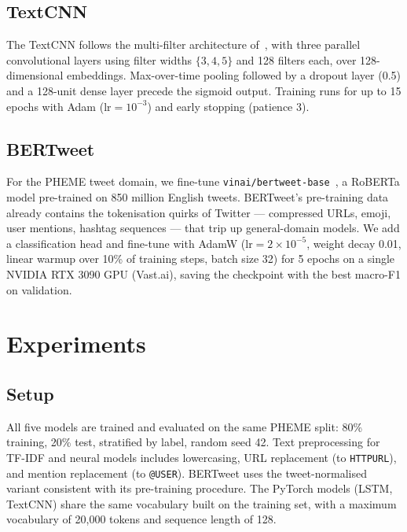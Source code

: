 \documentclass[sigconf]{acmart}
\begin{document}
\subsection{TextCNN}

The TextCNN follows the multi-filter architecture of~\citet{kim2014convolutional},
with three parallel convolutional layers using filter widths $\{3, 4, 5\}$ and 128 filters
each, over 128-dimensional embeddings. Max-over-time pooling followed by a dropout layer
(0.5) and a 128-unit dense layer precede the sigmoid output. Training runs for up to
15 epochs with Adam ($\text{lr}=10^{-3}$) and early stopping (patience 3).

\subsection{BERTweet}

For the PHEME tweet domain, we fine-tune \texttt{vinai/bertweet-base}~\cite{nguyen2020bertweet},
a RoBERTa model pre-trained on 850 million English tweets. BERTweet's pre-training data
already contains the tokenisation quirks of Twitter — compressed URLs, emoji, user mentions,
hashtag sequences — that trip up general-domain models. We add a classification head
and fine-tune with AdamW ($\text{lr}=2\times10^{-5}$, weight decay 0.01, linear warmup
over 10\% of training steps, batch size 32) for 5 epochs on a single NVIDIA RTX 3090 GPU
(Vast.ai), saving the checkpoint with the best macro-F1 on validation.


\section{Experiments}

\subsection{Setup}

All five models are trained and evaluated on the same PHEME split: 80\% training, 20\% test,
stratified by label, random seed 42. Text preprocessing for TF-IDF and neural models includes
lowercasing, URL replacement (to \texttt{HTTPURL}), and mention replacement (to \texttt{@USER}).
BERTweet uses the tweet-normalised variant consistent with its pre-training procedure. The
PyTorch models (LSTM, TextCNN) share the same vocabulary built on the training set, with a
maximum vocabulary of 20,000 tokens and sequence length of 128.
\end{document}
